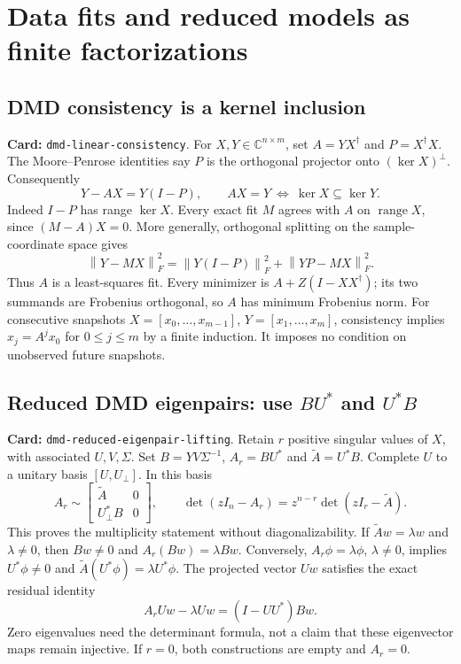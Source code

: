 \documentclass[11pt,a4paper]{article}
\newcommand{\C}{\mathbb C}
\newcommand{\norm}[1]{\left\lVert#1\right\rVert}
\DeclareRobustCommand{\code}[1]{{\footnotesize\urlstyle{tt}\nolinkurl{#1}}}
\begin{document}
\section{Data fits and reduced models as finite factorizations}
\subsection{DMD consistency is a kernel inclusion}
\label{route:dmd-linear-consistency}
\textbf{Card:} \code{dmd-linear-consistency}.
For $X,Y\in\C^{n\times m}$, set $A=YX^\dagger$ and $P=X^\dagger X$.
The Moore--Penrose identities say $P$ is the orthogonal projector onto
$(\ker X)^\perp$. Consequently
\[
 Y-AX=Y(I-P),\qquad AX=Y\ \Longleftrightarrow\ \ker X\subseteq\ker Y.
\]
Indeed $I-P$ has range $\ker X$. Every exact fit $M$ agrees with $A$
on $\operatorname{range}X$, since $(M-A)X=0$. More generally, orthogonal
splitting on the sample-coordinate space gives
\[
 \norm{Y-MX}_F^2=\norm{Y(I-P)}_F^2+\norm{YP-MX}_F^2.
\]
Thus $A$ is a least-squares fit. Every minimizer is
$A+Z(I-XX^\dagger)$; its two summands are Frobenius orthogonal, so $A$
has minimum Frobenius norm. For consecutive snapshots
$X=[x_0,\ldots,x_{m-1}]$, $Y=[x_1,\ldots,x_m]$, consistency implies
$x_j=A^jx_0$ for $0\le j\le m$ by a finite induction.
It imposes no condition on unobserved future snapshots.

\subsection{Reduced DMD eigenpairs: use $BU^*$ and $U^*B$}
\label{route:dmd-reduced-eigenpair-lifting}
\textbf{Card:} \code{dmd-reduced-eigenpair-lifting}.
Retain $r$ positive singular values of $X$, with associated $U,V,\Sigma$.
Set $B=YV\Sigma^{-1}$, $A_r=BU^*$ and $\widetilde A=U^*B$.
Complete $U$ to a unitary basis $[U,U_\perp]$. In this basis
\[
 A_r\sim\begin{bmatrix}\widetilde A&0\\U_\perp^*B&0\end{bmatrix},\qquad
 \det(zI_n-A_r)=z^{n-r}\det(zI_r-\widetilde A).
\]
This proves the multiplicity statement without diagonalizability.
If $\widetilde Aw=\lambda w$ and $\lambda\ne0$, then $Bw\ne0$ and
$A_r(Bw)=\lambda Bw$. Conversely, $A_r\phi=\lambda\phi$, $\lambda\ne0$,
implies $U^*\phi\ne0$ and $\widetilde A(U^*\phi)=\lambda U^*\phi$.
The projected vector $Uw$ satisfies the exact residual identity
\[
 A_rUw-\lambda Uw=(I-UU^*)Bw.
\]
Zero eigenvalues need the determinant formula, not a claim that these
eigenvector maps remain injective. If $r=0$, both constructions are empty
and $A_r=0$.
\end{document}
